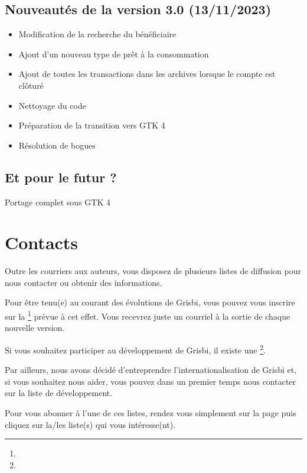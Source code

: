 \subsection{Nouveautés de la version 3.0 \textnormal{(13/11/2023)}}

\begin{itemize}
	\item Modification de la recherche du bénéficiaire
	\item Ajout d'un nouveau type de prêt à la consommation
	\item Ajout de toutes les transactions dans les archives lorsque le compte est clôturé
	\item Nettoyage du code
	\item Préparation de la transition vers \gls{GTK} 4
	\item Résolution de bogues
\end{itemize}

\subsection{Et pour le futur ?}

Portage complet sous \gls{GTK} 4


\section{Contacts\label{introduction-contacts}} 	%


Outre les courriers aux auteurs, vous disposez de plusieurs listes de diffusion pour nous contacter ou obtenir des informations.

Pour être tenu(e) au courant des évolutions de Grisbi, vous pouvez vous inscrire sur la \footnote{\urlListInfoEmail{}} prévue à cet effet. Vous recevrez juste un courriel à la sortie de chaque nouvelle version.

Si vous souhaitez participer au développement de Grisbi, il existe une \footnote{\urlListDevelEmail{}}.

Par ailleurs, nous avons décidé d'entreprendre l'internationalisation de Grisbi et, si vous souhaitez nous aider, vous pouvez dans un premier temps nous contacter sur la liste de développement.

Pour vous abonner à l'une de ces listes, rendez vous simplement sur la page \urlListDiffGrisbi{} puis cliquez sur la/les liste(s) qui vous intéresse(nt).

